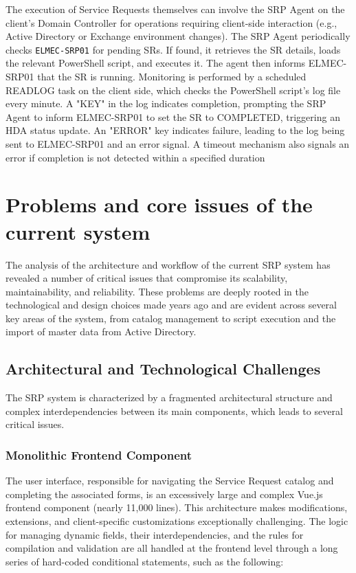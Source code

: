 The execution of Service Requests themselves can involve the SRP Agent on the client's Domain Controller for operations requiring client-side interaction (e.g., Active Directory or Exchange environment changes). The SRP Agent periodically checks \texttt{ELMEC-SRP01} for pending SRs. If found, it retrieves the SR details, loads the relevant PowerShell script, and executes it. The agent then informs ELMEC-SRP01 that the SR is running. Monitoring is performed by a scheduled READLOG task on the client side, which checks the PowerShell script's log file every minute. A "KEY" in the log indicates completion, prompting the SRP Agent to inform ELMEC-SRP01 to set the SR to COMPLETED, triggering an HDA status update. An "ERROR" key indicates failure, leading to the log being sent to ELMEC-SRP01 and an error signal. A timeout mechanism also signals an error if completion is not detected within a specified duration


\section{Problems and core issues of the current system}
The analysis of the architecture and workflow of the current SRP system has revealed a number of critical issues that compromise its scalability, maintainability, and reliability. These problems are deeply rooted in the technological and design choices made years ago and are evident across several key areas of the system, from catalog management to script execution and the import of master data from Active Directory.

\subsection{Architectural and Technological Challenges}

The SRP system is characterized by a fragmented architectural structure and complex interdependencies between its main components, which leads to several critical issues.

\subsubsection{Monolithic Frontend Component}
The user interface, responsible for navigating the Service Request catalog and completing the associated forms, is an excessively large and complex Vue.js frontend component (nearly 11,000 lines). This architecture makes modifications, extensions, and client-specific customizations exceptionally challenging. The logic for managing dynamic fields, their interdependencies, and the rules for compilation and validation are all handled at the frontend level through a long series of hard-coded conditional statements, such as the following:

